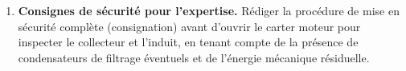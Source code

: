 \documentclass[11pt]{article}
\begin{document}
\begin{exercice}
\begin{enumerate}
\begin{enumerate}
        \item On souhaite réduire les étincelles au collecteur sans changer les balais. Proposer une modification du circuit d'alimentation (composant(s) à ajouter) et justifier son action sur la forme d'onde du courant et la tension de auto-induction lors de la commutation.
    \end{enumerate}
    \item \textbf{Consignes de sécurité pour l'expertise.} Rédiger la procédure de mise en sécurité complète (consignation) avant d'ouvrir le carter moteur pour inspecter le collecteur et l'induit, en tenant compte de la présence de condensateurs de filtrage éventuels et de l'énergie mécanique résiduelle.
\end{enumerate}
\end{exercice}
\end{document}
